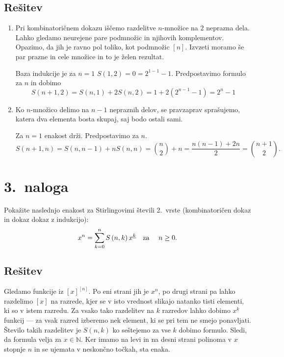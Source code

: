 \documentclass[11pt]{article}
\begin{document}
\subsection*{Rešitev}
\begin{enumerate}[label=(\alph*)]
    \item Pri kombinatoričnem dokazu iščemo razdelitve \(n\)-množice na \(2\) neprazna dela.
        Lahko gledamo neurejene pare podmnožic in njihovih komplementov. Opazimo, da jih je ravno pol toliko,
        kot podmnožic \([n]\). Izvzeti moramo še par prazne in cele množice in to je želen rezultat.

        Baza indukcije je za \(n=1\) \(S\left(1, 2\right) = 0 = 2 ^ {1 - 1} - 1\). Predpostavimo formulo za \(n\) in dobimo
        \[S\left(n + 1, 2\right) = S(n, 1) + 2 S\left(n, 2\right) = 1 + 2 \left(2 ^ {n - 1} - 1\right) = 2 ^ {n} - 1\]
    \item Ko \(n\)-množico delimo na \(n-1\) nepraznih delov, se pravzaprav sprašujemo, katera dva elementa bosta skupaj,
        saj bodo ostali sami.

        Za \(n=1\) enakost drži. Predpostavimo za \(n\).
        \[S\left(n + 1, n\right) = S\left(n, n - 1\right) + n S\left(n, n\right) = 
        \binom{n}{2} + n = \frac{n\left(n - 1\right) + 2n}{2} = \binom{n + 1}{2}.\]
\end{enumerate}

\section*{3.~naloga}
Pokažite naslednjo enakost za Stirlingovimi števili 2.~vrste (kombinatoričen dokaz in dokaz
dokaz z indukcijo):
\[
    x^n = \sum_{k=0}^{n}S\left(n, k\right) x ^ {\underline{k}} \text{\quad za \quad} n \ge 0.
\]

\subsection*{Rešitev}
Gledamo funkcije iz \({[x]}^{[n]}\). Po eni strani jih je \(x^n\), po drugi strani pa lahko razdelimo
\([x]\) na razrede, kjer se v isto vrednost slikajo natanko tisti elementi, ki so v istem razredu.
Za vsako tako razdelitev na \(k\) razredov lahko dobimo \(x^{\underline{k}}\) funkcij --- za vsak razred izberemo nek element, ki se pri
tem ne smejo ponavljati. Število takih razdelitev je \(S\left(n, k\right)\) ko seštejemo za vse \(k\) dobimo
formulo. Sledi, da formula velja za \(x \in \mathbb{N}\). Ker imamo na levi in na desni strani polinoma v \(x\) stopnje \(n\)
in se ujemata v neskončno točkah, sta enaka.
\end{document}
